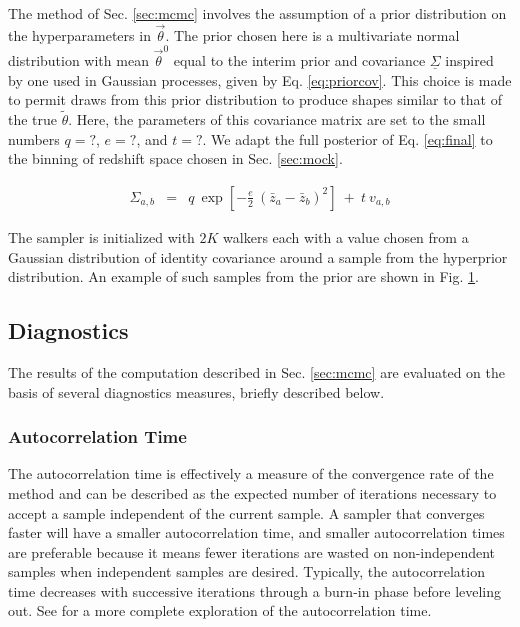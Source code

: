 \documentclass[preprint]{aastex}
\newcommand{\textul}{\underline}
\begin{document}
The method of Sec. \ref{sec:mcmc} involves the assumption of a prior 
distribution on the hyperparameters in $\vec{\theta}$.  The prior chosen here 
is a multivariate normal distribution with mean $\vec{\theta}^{0}$ equal to the 
interim prior and covariance $\textul{\Sigma}$ inspired by one used in Gaussian 
processes, given by Eq. \ref{eq:priorcov}.  This choice is made to permit draws 
from this prior distribution to produce shapes similar to that of the true 
$\tilde{\theta}$.  Here, the parameters of this covariance matrix are set to 
the small numbers $q=?$, $e=?$, and $t=?$.  We adapt the full posterior of Eq. 
\ref{eq:final} to the binning of redshift space chosen in Sec. \ref{sec:mock}.

\begin{eqnarray}
\label{eq:priorcov}
\Sigma_{a,b} &=& q\ \exp[-\frac{e}{2}\ (\bar{z}_{a}-\bar{z}_{b})^{2}]\ +\ t\ 
v_{a,b}
\end{eqnarray}

The sampler is initialized with $2K$ walkers each with a value chosen from a 
Gaussian distribution of identity covariance around a sample from the 
hyperprior distribution.  An example of such samples from the prior are shown 
in Fig. \ref{fig:nullprior}.

\begin{figure}
\caption{}
\label{fig:nullprior}
\end{figure}

\clearpage
\subsection{Diagnostics}
\label{sec:diag}

The results of the computation described in Sec. \ref{sec:mcmc} are evaluated 
on the basis of several diagnostics measures, briefly described below.

\subsubsection{Autocorrelation Time}
\label{sec:acorr}

The autocorrelation time is effectively a measure of the convergence rate of 
the method and can be described as the expected number of iterations necessary 
to accept a sample independent of the current sample.  A sampler that converges 
faster will have a smaller autocorrelation time, and smaller autocorrelation 
times are preferable because it means fewer iterations are wasted on 
non-independent samples when independent samples are desired.  Typically, the 
autocorrelation time decreases with successive iterations through a burn-in 
phase before leveling out.  See \citet{Foreman-Mackey2013} for a more complete 
exploration of the autocorrelation time.
\end{document}
